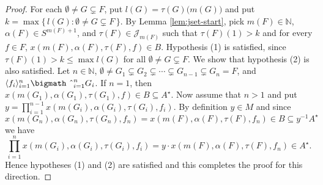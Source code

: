 \documentclass[12pt]{article}
\theoremstyle{plain}
\theoremstyle{definition}
\newcommand{\la}{\langle}
\newcommand{\ra}{\rangle}
\newcommand{\bbN}{\mathbb{N}}
\newcommand{\calJ}{\mathcal{J}}
\newcommand{\bigtimes}{\hbox{\bigmath \char'2}}
\begin{document}
\begin{proof}
  For each $\emptyset \ne G \subsetneq F$, put $l(G) = \tau(G)\bigl( m(G) \bigr)$ and put $k = \max\{\, l(G) : \emptyset \ne G \subsetneq F \,\}$.
  By Lemma \ref{lem:jset-start}, pick $m(F) \in \bbN$, $\alpha(F) \in S^{m(F)+1}$, and $\tau(F) \in \calJ_{m(F)}$ such that $\tau(F)(1) > k$ and for every $f \in F$, $x(m(F), \alpha(F), \tau(F), f) \in B$.
  Hypothesis (1) is satisfied, since $\tau(F)(1) > k \le \max l(G)$ for all $\emptyset \ne G \subsetneq F$.
  We show that hypothesis (2) is also satisfied.
  Let $n \in \bbN$, $\emptyset \ne G_1 \subsetneq G_2 \subsetneq \cdots \subsetneq G_{n-1} \subsetneq G_n = F$, and $\la f_i \ra_{i=1}^n \bigtimes_{i=1}^n G_i$. 
  If $n = 1$, then $x(m(G_1), \alpha(G_1), \tau(G_1), f) \in B \subseteq A^\star$.
  Now assume that $n > 1$ and put $y = \prod_{i=1}^{n-1} x(m(G_i), \alpha(G_i), \tau(G_i), f_i)$. 
  By definition $y \in M$ and since $x(m(G_n), \alpha(G_n), \tau(G_n), f_n) = x(m(F), \alpha(F), \tau(F), f_n) \in B \subseteq y^{-1}A^\star$ we have
  \[
    \textstyle
    \prod_{i=1}^n x(m(G_i), \alpha(G_i), \tau(G_i), f_i) = y \cdot x(m(F), \alpha(F), \tau(F), f_n) \in A^\star.
  \]
  Hence hypotheses (1) and (2) are satisfied and this completes the proof for this direction.
\end{proof}




\end{document}
